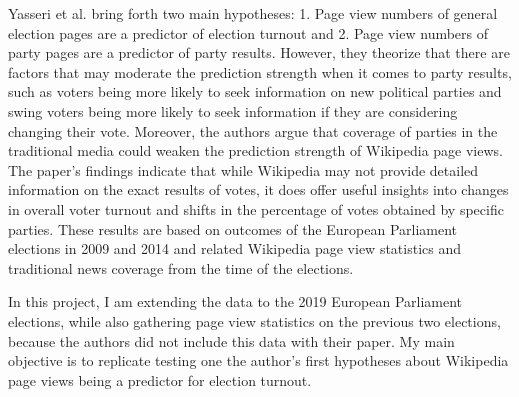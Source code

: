 Yasseri et al. bring forth two main hypotheses: 1. Page view numbers of general election pages are a predictor of election turnout and 2. Page view numbers of party pages are a predictor of party results. However, they theorize that there are factors that may moderate the prediction strength when it comes to party results, such as voters being more likely to seek information on new political parties and swing voters being more likely to seek information if they are considering changing their vote. Moreover, the authors argue that coverage of parties in the traditional media could weaken the prediction strength of Wikipedia page views. The paper's findings indicate that while Wikipedia may not provide detailed information on the exact results of votes, it does offer useful insights into changes in overall voter turnout and shifts in the percentage of votes obtained by specific parties. These results are based on outcomes of the European Parliament elections in 2009 and 2014 and related Wikipedia page view statistics and traditional news coverage from the time of the elections. 

In this project, I am extending the data to the 2019 European Parliament elections, while also gathering page view statistics on the previous two elections, because the authors did not include this data with their paper. My main objective is to replicate testing one the author's first hypotheses about Wikipedia page views being a predictor for election turnout.

